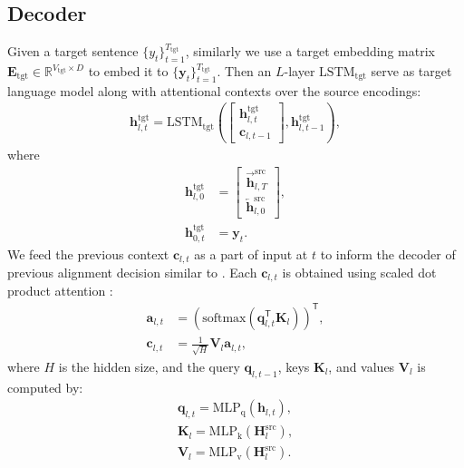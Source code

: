 \documentclass[11pt,a4paper]{article}
\begin{document}
\subsection{Decoder}
Given a target sentence $\{y_t\}_{t=1}^{T_\text{tgt}}$, similarly we use a target embedding matrix $\mathbf{E}_\text{tgt}\in\mathbb{R}^{V_\text{tgt}\times D}$ to embed it to $\{\mathbf{y}_t\}_{t=1}^{T_\text{tgt}}$. Then an $L$-layer $\mathrm{LSTM}_\text{tgt}$ serve as target language model along with attentional contexts over the source encodings:
\begin{align}
    \mathbf{h}^\text{tgt}_{l,t} = \mathrm{LSTM}_\text{tgt}\left(
    \begin{bmatrix}
    \mathbf{h}^\text{tgt}_{l,t} \\
    \mathbf{c}_{l,t-1}
    \end{bmatrix}, \mathbf{h}^\text{tgt}_{l,t-1}
    \right),
\end{align}
where
\begin{align}
    \mathbf{h}^\text{tgt}_{l,0} &= \begin{bmatrix}
    \overrightarrow{\mathbf{h}}^\text{src}_{l,T} \\
    \overleftarrow{\mathbf{h}}^\text{src}_{l,0}
  \end{bmatrix}, \\
    \mathbf{h}^\text{tgt}_{0,t} &= \mathbf{y}_t.
\end{align}
We feed the previous context $\mathbf{c}_{l,t}$ as a part of input at $t$ to inform the decoder of previous alignment decision similar to \citet{luong2015effective}. Each $\mathbf{c}_{l,t}$ is obtained using scaled dot product attention \cite{vaswani2017attention}:
\begin{align}
    \mathbf{a}_{l,t} &= (\mathrm{softmax}(\mathbf{q}_{l,t}^\mathsf{T}\mathbf{K}_l))^\mathsf{T}, \\
    \mathbf{c}_{l,t} &= \frac{1}{\sqrt{H}}\mathbf{V}_l\mathbf{a}_{l,t},
\end{align}
where $H$ is the hidden size, and the query $\mathbf{q}_{l,t-1}$, keys $\mathbf{K}_l$, and values $\mathbf{V}_l$ is computed by:
\begin{align}
    \mathbf{q}_{l,t} = \text{MLP}_\text{q}(\mathbf{h}_{l,t}), \\
    \mathbf{K}_l = \text{MLP}_\text{k}(\mathbf{H}^\text{src}_l), \\
    \mathbf{V}_l = \text{MLP}_\text{v}(\mathbf{H}^\text{src}_l).
\end{align}
\end{document}
